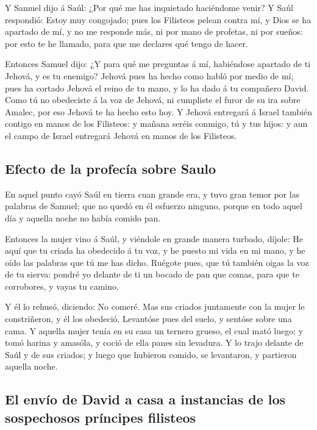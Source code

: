  Y Samuel dijo á Saúl: ¿Por qué me has inquietado
haciéndome venir? Y Saúl respondió: Estoy muy congojado; pues los
Filisteos pelean contra mí, y Dios se ha apartado de mí, y no me
responde más, ni por mano de profetas, ni por sueños: por esto te he
llamado, para que me declares qué tengo de hacer.

 Entonces Samuel dijo: ¿Y para qué me preguntas á mí,
habiéndose apartado de ti Jehová, y es tu enemigo? 
Jehová pues ha hecho como habló por medio de mí; pues ha cortado Jehová
el reino de tu mano, y lo ha dado á tu compañero David. 
Como tú no obedeciste á la voz de Jehová, ni cumpliste el furor de su
ira sobre Amalec, por eso Jehová te ha hecho esto hoy.  Y
Jehová entregará á Israel también contigo en manos de los Filisteos: y
mañana seréis conmigo, tú y tus hijos: y aun el campo de Israel
entregará Jehová en manos de los Filisteos.

\hypertarget{efecto-de-la-profecuxeda-sobre-saulo}{%
\subsection{Efecto de la profecía sobre
Saulo}\label{efecto-de-la-profecuxeda-sobre-saulo}}

 En aquel punto cayó Saúl en tierra cuan grande era, y
tuvo gran temor por las palabras de Samuel; que no quedó en él esfuerzo
ninguno, porque en todo aquel día y aquella noche no había comido pan.

 Entonces la mujer vino á Saúl, y viéndole en grande
manera turbado, díjole: He aquí que tu criada ha obedecido á tu voz, y
he puesto mi vida en mi mano, y he oído las palabras que tú me has
dicho.  Ruégote pues, que tú también oigas la voz de tu
sierva: pondré yo delante de ti un bocado de pan que comas, para que te
corrobores, y vayas tu camino.

 Y él lo rehusó, diciendo: No comeré. Mas sus criados
juntamente con la mujer le constriñeron, y él los obedeció. Levantóse
pues del suelo, y sentóse sobre una cama.  Y aquella
mujer tenía en su casa un ternero grueso, el cual mató luego; y tomó
harina y amasóla, y coció de ella panes sin levadura.  Y
lo trajo delante de Saúl y de sus criados; y luego que hubieron comido,
se levantaron, y partieron aquella noche.

\hypertarget{el-envuxedo-de-david-a-casa-a-instancias-de-los-sospechosos-pruxedncipes-filisteos}{%
\subsection{El envío de David a casa a instancias de los sospechosos
príncipes
filisteos}\label{el-envuxedo-de-david-a-casa-a-instancias-de-los-sospechosos-pruxedncipes-filisteos}}

